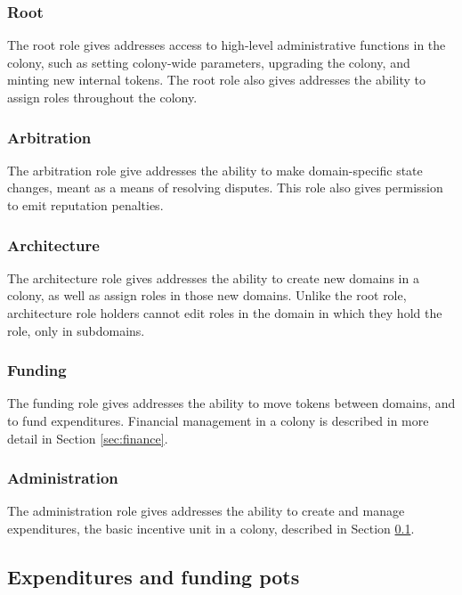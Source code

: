 \subsubsection*{Root}

The root role gives addresses access to high-level administrative functions in the colony, such as setting colony-wide parameters, upgrading the colony, and minting new internal tokens. The root role also gives addresses the ability to assign roles throughout the colony.

\subsubsection*{Arbitration}

The arbitration role give addresses the ability to make domain-specific state changes, meant as a means of resolving disputes. This role also gives permission to emit reputation penalties.

\subsubsection*{Architecture}

The architecture role gives addresses the ability to create new domains in a colony, as well as assign roles in those new domains. Unlike the root role, architecture role holders cannot edit roles in the domain in which they hold the role, only in subdomains.

\subsubsection*{Funding}

The funding role gives addresses the ability to move tokens between domains, and to fund expenditures. Financial management in a colony is described in more detail in Section \ref{sec:finance}.

\subsubsection*{Administration}

The administration role gives addresses the ability to create and manage expenditures, the basic incentive unit in a colony, described in Section \ref{sec:expenditures}.

\subsection{Expenditures and funding pots}\label{sec:expenditures}\label{sec:finance}

